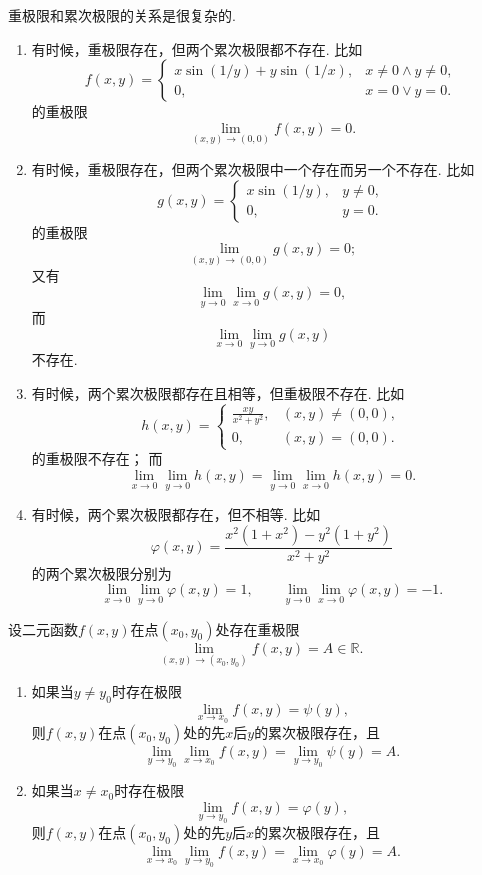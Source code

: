 \begin{example}
重极限和累次极限的关系是很复杂的.
\begin{enumerate}
	\item 有时候，重极限存在，但两个累次极限都不存在.
	比如\[
		f(x,y) = \left\{ \begin{array}{cl}
			x \sin(1/y) + y \sin(1/x), & x\neq0 \land y\neq0, \\
			0, & x=0 \lor y=0.
		\end{array} \right.
	\]的重极限\[
		\lim\limits_{(x,y)\to(0,0)} f(x,y) = 0.
	\]

	\item 有时候，重极限存在，但两个累次极限中一个存在而另一个不存在.
	比如\[
		g(x,y) = \left\{ \begin{array}{cl}
			x \sin(1/y), & y\neq0, \\
			0, & y=0.
		\end{array} \right.
	\]的重极限\[
		\lim\limits_{(x,y)\to(0,0)} g(x,y) = 0;
	\]
	又有\[
		\lim\limits_{y\to0} \lim\limits_{x\to0} g(x,y) = 0,
	\]
	而\[
		\lim\limits_{x\to0} \lim\limits_{y\to0} g(x,y)
	\]不存在.

	\item 有时候，两个累次极限都存在且相等，但重极限不存在.
	比如\[
		h(x,y) = \left\{ \begin{array}{cl}
			\frac{xy}{x^2+y^2}, & (x,y)\neq(0,0), \\
			0, & (x,y)=(0,0).
		\end{array} \right.
	\]的重极限不存在；
	而\[
		\lim\limits_{x\to0} \lim\limits_{y\to0} h(x,y)
		= \lim\limits_{y\to0} \lim\limits_{x\to0} h(x,y) = 0.
	\]

	\item 有时候，两个累次极限都存在，但不相等.
	比如\[
		\varphi(x,y) = \frac{x^2(1+x^2) - y^2(1+y^2)}{x^2+y^2}
	\]的两个累次极限分别为\[
		\lim\limits_{x\to0} \lim\limits_{y\to0} \varphi(x,y) = 1,
		\qquad
		\lim\limits_{y\to0} \lim\limits_{x\to0} \varphi(x,y) = -1.
	\]
\end{enumerate}
\end{example}

\begin{theorem}
设二元函数\(f(x,y)\)在点\((x_0,y_0)\)处存在重极限\[
	\lim\limits_{(x,y)\to(x_0,y_0)} f(x,y) = A \in \mathbb{R}.
\]\begin{enumerate}
	\item 如果当\(y \neq y_0\)时存在极限\[
		\lim\limits_{x \to x_0} f(x,y) = \psi(y),
	\]
	则\(f(x,y)\)在点\((x_0,y_0)\)处的先\(x\)后\(y\)的累次极限存在，且\[
		\lim\limits_{y \to y_0} \lim\limits_{x \to x_0} f(x,y)
		= \lim\limits_{y \to y_0} \psi(y) = A.
	\]

	\item 如果当\(x \neq x_0\)时存在极限\[
		\lim\limits_{y \to y_0} f(x,y) = \varphi(y),
	\]
	则\(f(x,y)\)在点\((x_0,y_0)\)处的先\(y\)后\(x\)的累次极限存在，且\[
		\lim\limits_{x \to x_0} \lim\limits_{y \to y_0} f(x,y)
		= \lim\limits_{x \to x_0} \varphi(y) = A.
	\]
\end{enumerate}
\end{theorem}

